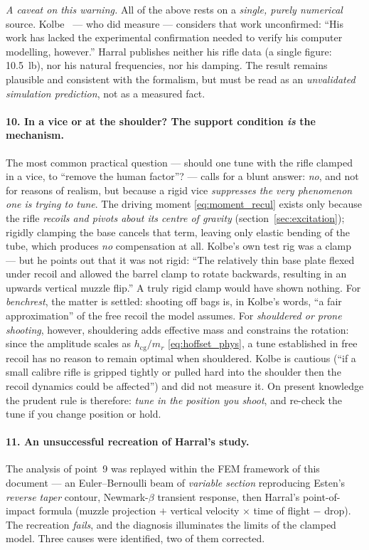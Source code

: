 \documentclass[12pt,a4paper]{article}
\begin{document}
	\emph{A caveat on this warning.} All of the above rests on a \emph{single, purely numerical} source. Kolbe~\cite{KolbeSim} --- who did measure --- considers that work unconfirmed: ``His work has lacked the experimental confirmation needed to verify his computer modelling, however.'' Harral publishes neither his rifle data (a single figure: 10.5~lb), nor his natural frequencies, nor his damping. The result remains plausible and consistent with the formalism, but must be read as an \emph{unvalidated simulation prediction}, not as a measured fact.

	\paragraph{10. In a vice or at the shoulder? The support condition \emph{is} the mechanism.} The most common practical question --- should one tune with the rifle clamped in a vice, to ``remove the human factor''? --- calls for a blunt answer: \emph{no}, and not for reasons of realism, but because a rigid vice \emph{suppresses the very phenomenon one is trying to tune}. The driving moment \eqref{eq:moment_recul} exists only because the rifle \emph{recoils and pivots about its centre of gravity} (section~\ref{sec:excitation}); rigidly clamping the base cancels that term, leaving only elastic bending of the tube, which produces \emph{no} compensation at all. Kolbe's own test rig was a clamp --- but he points out that it was not rigid: ``The relatively thin base plate flexed under recoil and allowed the barrel clamp to rotate backwards, resulting in an upwards vertical muzzle flip.'' A truly rigid clamp would have shown nothing. For \emph{benchrest}, the matter is settled: shooting off bags is, in Kolbe's words, ``a fair approximation'' of the free recoil the model assumes. For \emph{shouldered or prone shooting}, however, shouldering adds effective mass and constrains the rotation: since the amplitude scales as $h_\text{cg}/m_r$ \eqref{eq:hoffset_phys}, a tune established in free recoil has no reason to remain optimal when shouldered. Kolbe is cautious (``if a small calibre rifle is gripped tightly or pulled hard into the shoulder then the recoil dynamics could be affected'') and did not measure it. On present knowledge the prudent rule is therefore: \emph{tune in the position you shoot}, and re-check the tune if you change position or hold.

	\paragraph{11. An unsuccessful recreation of Harral's study.} The analysis of point~9 was replayed within the FEM framework of this document --- an Euler--Bernoulli beam of \emph{variable section} reproducing Esten's \emph{reverse taper} contour, Newmark-$\beta$ transient response, then Harral's point-of-impact formula (muzzle projection $+$ vertical velocity $\times$ time of flight $-$ drop). The recreation \emph{fails}, and the diagnosis illuminates the limits of the clamped model. Three causes were identified, two of them corrected.
\end{document}
